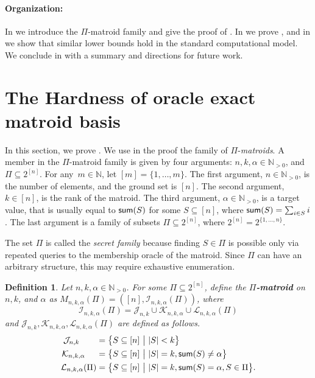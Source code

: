 \documentclass[11pt,letter]{article}
\newcommand{\cI}{{\mathcal{I}}}
\newtheorem{definition}[lemma]{Definition}
\begin{document}
\paragraph{Organization:}
\label{sec:organization}

In  we introduce the $\Pi$-matroid family and give the proof of . In  we prove , and in
  we show that similar lower bounds hold in the standard computational model. We conclude in  with a summary and directions for future work.
		
\section{The Hardness of {\sc oracle exact matroid basis}}
\label{sec:technical}
\label{sec:Pi}
In this section, we prove . We use in the proof the family of $\Pi$-{\em matroids}. A member in the $\Pi$-matroid family is given by four arguments: $n,k,\alpha \in \mathbb{N}_{>0}$, and $\Pi \subseteq 2^{[n]}$. For any~$m\in \mathbb{N}$, let $[m]=\{1,\ldots, m\}$.
 The first argument, $n \in \mathbb{N}_{>0}$, is the number of elements, and the ground set is $[n]$. The second argument, $k \in [n]$, is the rank of the matroid. 
 The third argument, $\alpha\in \mathbb{N}_{>0}$, is a target value, that is usually equal to $\textnormal{\textsf{sum}}(S)$ for some $S \subseteq [n]$, where $\textnormal{\textsf{sum}}(S) = \sum_{i \in S} i$. The last argument is a family of subsets $\Pi \subseteq 2^{[n]}$, where $2^{[n]} = 2^{\{1,\ldots,n\}}$.


The set $\Pi$ is called the {\em secret family} because finding $S\in \Pi$ is possible only via repeated queries to the membership oracle of the matroid. Since $\Pi$ can have an arbitrary structure, this may require exhaustive enumeration.


\begin{definition}
	\label{def:Matroid}
	Let $n,k,\alpha \in \mathbb{N}_{>0}$. For some $\Pi \subseteq 2^{[n]}$, define the {\bf $\Pi$-matroid} on $n,k$, and $\alpha$ as $M_{n,k,\alpha}(\Pi) = ([n],\cI_{n,k,\alpha}(\Pi))$, where $$\cI_{n,k,\alpha}(\Pi) = \mathcal{J}_{n,k} \cup \mathcal{K}_{n,k,\alpha} \cup \mathcal{L}_{n,k,\alpha}(\Pi)$$ and $\mathcal{J}_{n,k}, \mathcal{K}_{n,k,\alpha}, \mathcal{L}_{n,k,\alpha}(\Pi)$ are defined as follows. \begin{equation}
		\label{eq:1}
		\begin{aligned}
			\mathcal{J}_{n,k}~~~~~~ = {} & \big\{S \subseteq [n]~\big|~ |S| < k\big\} \\
			\mathcal{K}_{n,k,\alpha}~~~~ = {} & \big\{S \subseteq [n]~\big|~ |S| = k, \textnormal{\textsf{sum}}(S) \neq \alpha\big\} \\
			\mathcal{L}_{n,k,\alpha}(\Pi) = {} & \big\{S \subseteq [n]~\big|~ |S| = k, \textnormal{\textsf{sum}}(S) = \alpha, S \in \Pi\big\}. \\
		\end{aligned}
	\end{equation}
\end{definition} 
\end{document}
